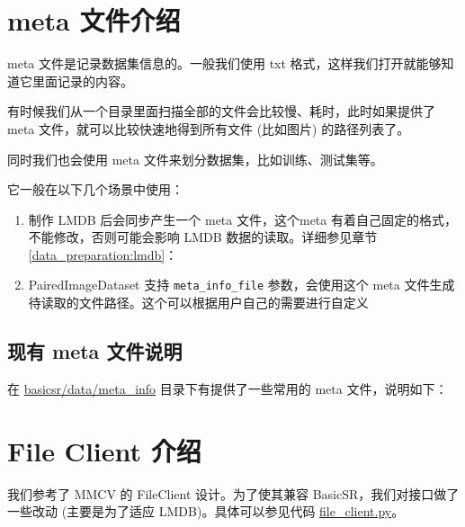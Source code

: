 \documentclass[../main.tex]{subfiles}
\begin{document}
\section{meta 文件介绍}\label{data_preparation:meta_file}

meta 文件是记录数据集信息的。一般我们使用 txt 格式，这样我们打开就能够知道它里面记录的内容。

有时候我们从一个目录里面扫描全部的文件会比较慢、耗时，此时如果提供了 meta 文件，就可以比较快速地得到所有文件 (比如图片) 的路径列表了。

同时我们也会使用 meta 文件来划分数据集，比如训练、测试集等。

它一般在以下几个场景中使用：

\begin{enumerate}
    \item 制作 LMDB 后会同步产生一个 meta 文件，这个meta 有着自己固定的格式，不能修改，否则可能会影响 LMDB 数据的读取。详细参见章节\ref{data_preparation:lmdb}：
    \item PairedImageDataset 支持 \texttt{meta\_info\_file} 参数，会使用这个 meta 文件生成待读取的文件路径。这个可以根据用户自己的需要进行自定义
\end{enumerate}


\subsection{现有 meta 文件说明}\label{data_preparation:existing_meta_file}

在 \href{https://github.com/XPixelGroup/BasicSR/tree/master/basicsr/data/meta_info}{basicsr/data/meta\_info} 目录下有提供了一些常用的 meta 文件，说明如下：


\section{File Client 介绍}\label{data_preparation:file_client}

我们参考了 MMCV 的 FileClient 设计。为了使其兼容 BasicSR，我们对接口做了一些改动 (主要是为了适应 LMDB)。具体可以参见代码 \href{https://github.com/XPixelGroup/BasicSR/blob/master/basicsr/utils/file_client.py}{file\_client.py}。

\end{document}
